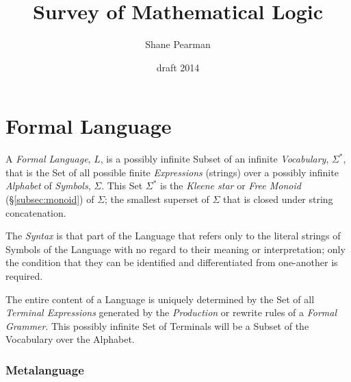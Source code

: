 \documentclass{article}
\begin{document}
\setcounter{secnumdepth}{5}
\setcounter{tocdepth}{5}


\title{Survey of Mathematical Logic}
\date{draft 2014}
\author{Shane Pearman}
\maketitle


\tableofcontents




\part{Formal Language}\label{sec:formal_language}

A \emph{Formal Language}, $L$, is a possibly infinite Subset of an
infinite \emph{Vocabulary}, $\Sigma^*$, that is the Set of all
possible finite \emph{Expressions} (strings) over a possibly infinite
\emph{Alphabet} of \emph{Symbols}, $\Sigma$. This Set $\Sigma^*$ is
the \emph{Kleene star} or \emph{Free Monoid} (\S\ref{subsec:monoid})
of $\Sigma$; the smallest superset of $\Sigma$ that is closed under
string concatenation.

The \emph{Syntax} is that part of the Language that refers only to the
literal strings of Symbols of the Language with no regard to their
meaning or interpretation; only the condition that they can be
identified and differentiated from one-another is required.

The entire content of a Language is uniquely determined by the Set of
all \emph{Terminal Expressions} generated by the \emph{Production} or
rewrite rules of a \emph{Formal Grammer}. This possibly infinite Set
of Terminals will be a Subset of the Vocabulary over the Alphabet.



\section{Metalanguage}\label{sec:metalanguage}
\end{document}
